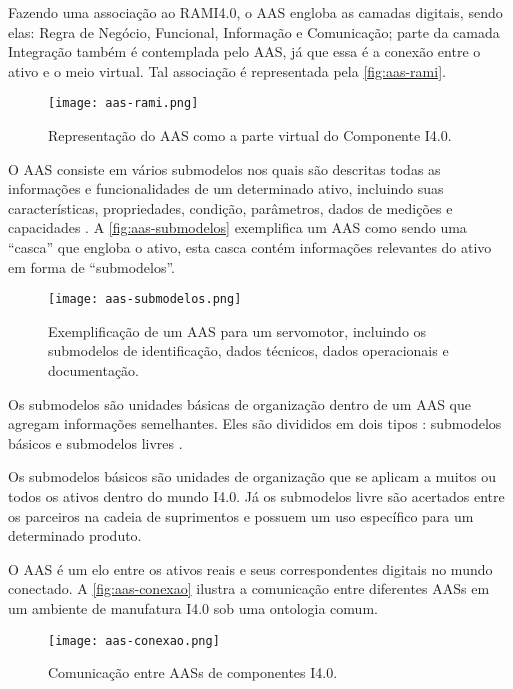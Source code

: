 	Fazendo uma associação ao RAMI4.0, o AAS engloba as camadas digitais, sendo elas: Regra de Negócio, Funcional, Informação e Comunicação; parte da camada Integração também é contemplada pelo AAS, já que essa é a conexão entre o ativo e o meio virtual. Tal associação é representada pela \autoref{fig:aas-rami}.

	\begin{figure}[htb]
		\centering
		\caption{Representação do AAS como a parte virtual do Componente I4.0.}
		\label{fig:aas-rami}
		\texttt{[image: aas-rami.png]}
	\end{figure}
		
	O AAS consiste em vários submodelos nos quais são descritas todas as informações e funcionalidades de um determinado ativo, incluindo suas características, propriedades, condição, parâmetros, dados de medições e capacidades \cite{bader2019aas}. A \autoref{fig:aas-submodelos} exemplifica um AAS como sendo uma ``casca'' que engloba o ativo, esta casca contém informações relevantes do ativo em forma de ``submodelos''.
	
	\begin{figure}[htb]
		\centering
		\caption{Exemplificação de um AAS para um servomotor, incluindo os submodelos de identificação, dados técnicos, dados operacionais e documentação.}
		\label{fig:aas-submodelos}
		\texttt{[image: aas-submodelos.png]}
	\end{figure}

	Os submodelos são unidades básicas de organização dentro de um AAS que agregam informações semelhantes. Eles são divididos em dois tipos \cite{plattform2019detailsaas}: submodelos básicos e submodelos livres \cite{bader2019aas}.
	
	Os submodelos básicos são unidades de organização que se aplicam a muitos ou todos os ativos dentro do mundo I4.0. Já os submodelos livre são acertados entre os parceiros na cadeia de suprimentos e possuem um uso específico para um determinado produto.
	
	O AAS é um elo entre os ativos reais e seus correspondentes digitais no mundo conectado. A \autoref{fig:aas-conexao} ilustra a comunicação entre diferentes AASs em um ambiente de manufatura I4.0 sob uma ontologia comum.
	
	\begin{figure}[htb]
		\centering
		\caption{Comunicação entre AASs de componentes I4.0.}
		\label{fig:aas-conexao}
		\texttt{[image: aas-conexao.png]}
	\end{figure}

